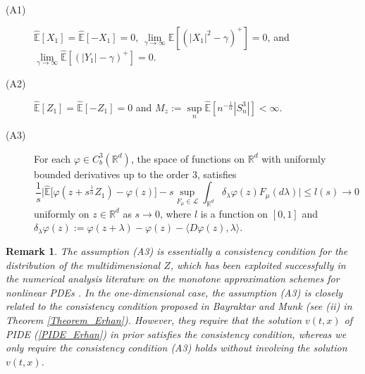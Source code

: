 \documentclass[a4paper,oneside,10pt]{article}%
\newtheorem{remark}[theorem]{Remark}
\numberwithin{equation}{section}
\begin{document}
\begin{description}
\item[(A1)] $\mathbb{\hat{E}}[X_{1}]=\mathbb{\hat{E}}[-X_{1}]=0$,
$\lim \limits_{\gamma \rightarrow \infty}\mathbb{\hat{E}}[(|X_{1}|^{2}-
\gamma)^{+}]=0$, and $\lim \limits_{\gamma \rightarrow \infty}\mathbb{\hat{E}
}[(|Y_{1}|-\gamma)^{+}]=0.$

\item[(A2)] $\mathbb{\hat{E}}[Z_{1}]=\mathbb{\hat{E}}[-Z_{1}]=0$ and
$M_{z}:=\sup \limits_{n}\mathbb{\hat{E}}[n^{-\frac{1}{\alpha} }|S_{n}%
^{3}|]<\infty$.

\item[(A3)] For each $\varphi \in C_{b}^{3}(\mathbb{R}^{d})$, the space of
functions on $\mathbb{R}^{d}$ with uniformly bounded derivatives up to the
order $3$, satisfies
\[
\frac{1}{s}\bigg \vert \mathbb{\hat{E}}\big[\varphi(z+s^{\frac{1}{\alpha}%
}Z_{1})-\varphi(z)\big]-s\sup \limits_{F_{\mu}\in \mathcal{L}}\int
_{\mathbb{R}^{d}}\delta_{\lambda}\varphi(z)F_{\mu}(d\lambda)\bigg \vert \leq
l(s)\rightarrow0
\]
uniformly on $z\in \mathbb{R}^{d}$ as $s\rightarrow0$, where $l$ is a function
on $[0,1]$ and $\delta_{\lambda}\varphi(z):=\varphi(z+\lambda)-\varphi
(z)-\langle D\varphi(z),\lambda \rangle$.
\end{description}

\begin{remark}
\label{Remark0} The assumption (A3) is essentially a consistency condition for
the distribution of the multidimensional $Z$, which has been exploited
successfully in the numerical analysis literature on the monotone
approximation schemes for nonlinear PDEs \cite{BJ2002,BJ2005,BJ2007,BS1991}.
In the one-dimensional case, the assumption (A3) is closely related to the
consistency condition proposed in Bayraktar and Munk \cite{BM2016} (see (ii)
in Theorem \ref{Theorem_Erhan}). However, they require that the solution
$v(t,x)$ of PIDE (\ref{PIDE_Erhan}) in prior satisfies the consistency
condition, whereas we only require the consistency condition (A3) holds
without involving the solution $v(t,x)$.
\end{remark}
\end{document}
